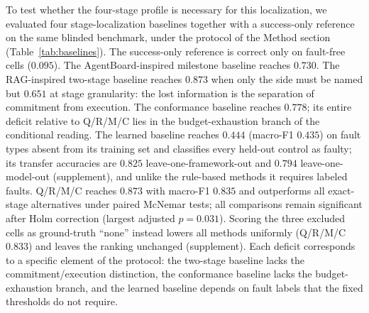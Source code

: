 \documentclass[letterpaper]{article} %
\begin{document}
To test whether the four-stage profile is necessary for this localization, we evaluated four stage-localization baselines together with a success-only reference on the same blinded benchmark, under the protocol of the Method section (Table~\ref{tab:baselines}). The success-only reference is correct only on fault-free cells ($0.095$). The AgentBoard-inspired milestone baseline reaches $0.730$. The RAG-inspired two-stage baseline reaches $0.873$ when only the side must be named but $0.651$ at stage granularity: the lost information is the separation of commitment from execution. The conformance baseline reaches $0.778$; its entire deficit relative to Q/R/M/C lies in the budget-exhaustion branch of the conditional reading. The learned baseline reaches $0.444$ (macro-F1 $0.435$) on fault types absent from its training set and classifies every held-out control as faulty; its transfer accuracies are $0.825$ leave-one-framework-out and $0.794$ leave-one-model-out (supplement), and unlike the rule-based methods it requires labeled faults. Q/R/M/C reaches $0.873$ with macro-F1 $0.835$ and outperforms all exact-stage alternatives under paired McNemar tests; all comparisons remain significant after Holm correction (largest adjusted $p=0.031$). Scoring the three excluded cells as ground-truth ``none'' instead lowers all methods uniformly (Q/R/M/C $0.833$) and leaves the ranking unchanged (supplement). Each deficit corresponds to a specific element of the protocol: the two-stage baseline lacks the commitment/execution distinction, the conformance baseline lacks the budget-exhaustion branch, and the learned baseline depends on fault labels that the fixed thresholds do not require.
\end{document}
